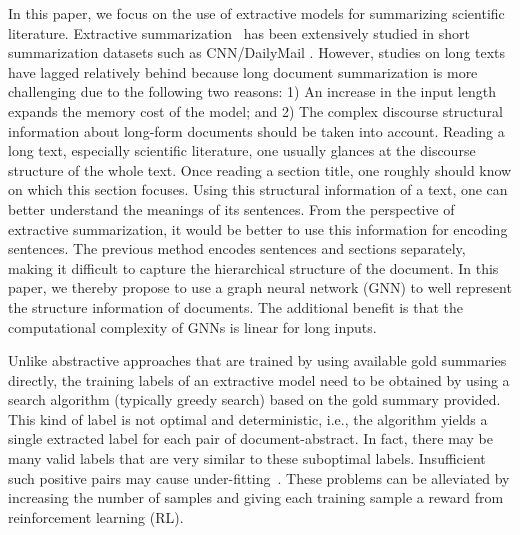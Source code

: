 In this paper, we focus on the use of extractive models for summarizing scientific literature.
Extractive summarization~\cite{matchsum_2020,zhou2018neural} has been extensively studied in short summarization datasets such as CNN/DailyMail \cite{cnndm}.
However, studies on long texts have lagged relatively behind because long document summarization is more challenging due to the following two reasons:
1) An increase in the input length expands the memory cost of the model; and
2) The complex discourse structural information about long-form documents should be taken into account.
Reading a long text, especially scientific literature, one usually glances at the discourse structure of the whole text. Once reading a section title, one roughly should know on which this section focuses. Using this structural information  of a text, one can better understand the meanings of its sentences. From the perspective of extractive summarization, it would be better to use this information for encoding sentences.
The previous method encodes sentences and sections separately, making it difficult to capture the hierarchical structure of the document.
In this paper, we thereby propose to use a graph neural network (GNN) to well represent the structure information of documents. The  additional benefit is that the computational complexity of GNNs is linear for long inputs.

Unlike abstractive approaches that are trained by  using available gold summaries directly, the training labels of an extractive model need to be obtained by using a search algorithm (typically greedy search) based on the gold summary provided.
This kind of label is not optimal and deterministic, i.e., the algorithm yields a single extracted label for each pair of document-abstract.
In fact, there may be many valid labels that are very similar to these suboptimal labels.
Insufficient such positive pairs may cause under-fitting~\cite{rl_2018}. 
These problems can be alleviated by increasing the number of samples and giving each training sample a reward from reinforcement learning (RL).

